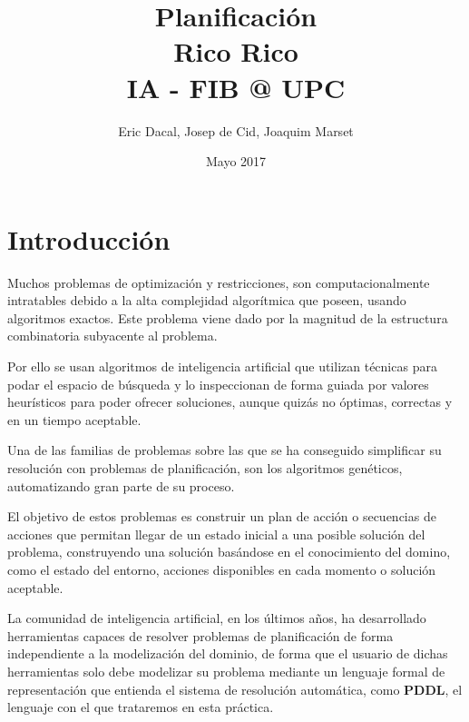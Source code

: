 \documentclass{article}
\title{%
  Planificación \\
  \large Rico Rico \\
  IA - FIB @ UPC
}
\author{\large Eric Dacal, Josep de Cid, Joaquim Marset}
\date{Mayo 2017}
\newenvironment{bottompar}{\par\vspace*{\fill}}{\clearpage}
\begin{document}
\maketitle
\begin{bottompar}
\tableofcontents
\end{bottompar}


\section{Introducción}
Muchos problemas de optimización y restricciones, son computacionalmente intratables debido a la alta complejidad algorítmica que poseen, usando algoritmos exactos. Este problema viene dado por la magnitud de la estructura combinatoria subyacente al problema.
\par
Por ello se usan algoritmos de inteligencia artificial que utilizan técnicas para podar el espacio de búsqueda y lo inspeccionan de forma guiada por valores heurísticos para poder ofrecer soluciones, aunque quizás no óptimas, correctas y en un tiempo aceptable.
\par
Una de las familias de problemas sobre las que se ha conseguido simplificar su resolución con problemas de planificación, son los algoritmos genéticos, automatizando gran parte de su proceso.
\par
El objetivo de estos problemas es construir un plan de acción o secuencias de acciones que permitan llegar de un estado inicial a una posible solución del problema, construyendo una solución basándose en el conocimiento del domino, como el estado del entorno, acciones disponibles en cada momento o solución aceptable.
\par
La comunidad de inteligencia artificial, en los últimos años, ha desarrollado herramientas capaces de resolver problemas de planificación de forma independiente a la modelización del dominio, de forma que el usuario de dichas herramientas solo debe modelizar su problema mediante un lenguaje formal de representación que entienda el sistema de resolución automática, como \textbf{PDDL}, el lenguaje con el que trataremos en esta práctica.
\end{document}
